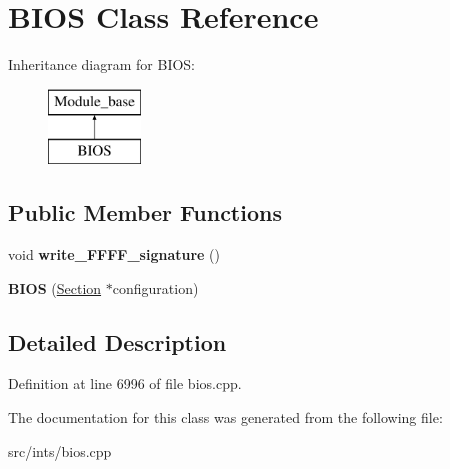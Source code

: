 \hypertarget{classBIOS}{\section{B\-I\-O\-S Class Reference}
\label{classBIOS}
}
Inheritance diagram for B\-I\-O\-S\-:\begin{figure}[H]
\begin{center}
\leavevmode
\includegraphics[height=2.000000cm]{classBIOS}
\end{center}
\end{figure}
\subsection*{Public Member Functions}
\begin{DoxyCompactItemize}
\item 
\hypertarget{classBIOS_ae2cf67c9872366656b32695ce56b3c0a}{void {\bfseries write\-\_\-\-F\-F\-F\-F\-\_\-signature} ()}\label{classBIOS_ae2cf67c9872366656b32695ce56b3c0a}

\item 
\hypertarget{classBIOS_a04ed247011d175b84c556487820fd64c}{{\bfseries B\-I\-O\-S} (\hyperlink{classSection}{Section} $\ast$configuration)}\label{classBIOS_a04ed247011d175b84c556487820fd64c}

\end{DoxyCompactItemize}


\subsection{Detailed Description}


Definition at line 6996 of file bios.\-cpp.



The documentation for this class was generated from the following file\-:\begin{DoxyCompactItemize}
\item 
src/ints/bios.\-cpp\end{DoxyCompactItemize}

